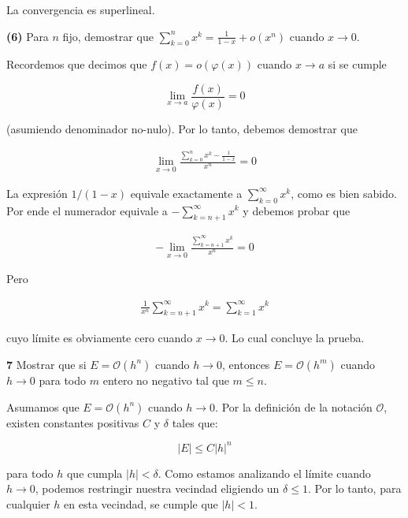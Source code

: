 \documentclass[12pt]{article}
\begin{document}
La convergencia es superlineal.

\pagebreak 

\begin{myframe}
    \textbf{(6)} Para $n$ fijo, demostrar que $\sum_{k=0}^{n} x^k = \frac{1}{1-x} + o(x^n)$ cuando $x \to 0$.
\end{myframe}

Recordemos que decimos que $f(x) = o \left( \varphi(x) \right) $ cuando $x \to
a$ si se cumple

\begin{equation*}
    \lim_{x \to a}  \frac{f(x)}{\varphi(x)} = 0
\end{equation*}

(asumiendo denominador no-nulo). Por lo tanto, debemos demostrar que 

\begin{align*}
    \lim_{x \to 0} \frac{ \sum_{k=0}^n x^k - \frac{1}{1-x}}{x^n} = 0
\end{align*}

La expresión $1 / (1-x)$ equivale exactamente a $\sum_{k=0}^\infty x^k$, como es
bien sabido. Por ende el numerador equivale a $-\sum_{k=n+1}^\infty x^k$ y
debemos probar que

\begin{align*}
    -\lim_{x \to 0} \frac{ \sum_{k=n+1}^\infty x^k }{x^n} = 0
\end{align*}

Pero 

\begin{align*}
    \frac{1}{x^n}\sum_{k=n+1}^\infty x^k = \sum_{k=1}^\infty x^k
\end{align*}

cuyo límite es obviamente cero cuando $x \to 0$. Lo cual concluye la prueba.

\pagebreak 

\begin{myframe}
    \textbf{7} Mostrar que si $E = \mathcal{O}(h^n)$ cuando $h \to 0$, entonces $E = \mathcal{O}(h^m)$ cuando $h \to 0$ para todo $m$ entero no negativo tal que $m \le n$.
\end{myframe}

Asumamos que $E = \mathcal{O}(h^n)$ cuando $h \to 0$. Por la definición de la
notación $\mathcal{O}$, existen constantes positivas $C$ y $\delta$ tales
que:

$$\left| E \right| \le C \left| h \right|^n$$

para todo $h$ que cumpla
$\left| h \right| < \delta$. Como estamos analizando el límite cuando $h \to 0$,
podemos restringir nuestra vecindad eligiendo un $\delta \le 1$. Por lo tanto,
para cualquier $h$ en esta vecindad, se cumple que $\left| h \right| < 1$.
\end{document}
